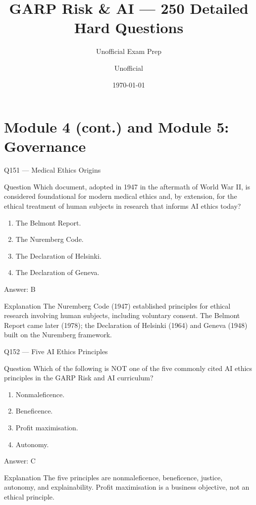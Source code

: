 \documentclass[aspectratio=169,8pt]{beamer}
\title[GARP RAI]{GARP Risk \& AI --- 250 Detailed Hard Questions}
\subtitle{Unofficial Exam Prep}
\author{Unofficial}
\date{\today}
\begin{document}
\section{Module 4 (cont.) and Module 5: Governance}

\begin{frame}{Q151 --- Medical Ethics Origins}
\begin{block}{Question}
Which document, adopted in 1947 in the aftermath of World War II, is considered foundational for modern medical ethics and, by extension, for the ethical treatment of human subjects in research that informs AI ethics today?

\begin{enumerate}
\item The Belmont Report.
\item The Nuremberg Code.
\item The Declaration of Helsinki.
\item The Declaration of Geneva.
\end{enumerate}  \end{block}
\begin{exampleblock}{Answer: B}\end{exampleblock}
\begin{block}{Explanation}
The Nuremberg Code (1947) established principles for ethical research involving human subjects, including voluntary consent. The Belmont Report came later (1978); the Declaration of Helsinki (1964) and Geneva (1948) built on the Nuremberg framework.
\end{block}
\end{frame}

\begin{frame}{Q152 --- Five AI Ethics Principles}
\begin{block}{Question}
Which of the following is NOT one of the five commonly cited AI ethics principles in the GARP Risk and AI curriculum?
\begin{enumerate}
\item Nonmaleficence.
\item Beneficence.
\item Profit maximisation.
\item Autonomy.
\end{enumerate}  \end{block}
\begin{exampleblock}{Answer: C}\end{exampleblock}
\begin{block}{Explanation}
The five principles are nonmaleficence, beneficence, justice, autonomy, and explainability. Profit maximisation is a business objective, not an ethical principle.
\end{block}
\end{frame}
\end{document}
